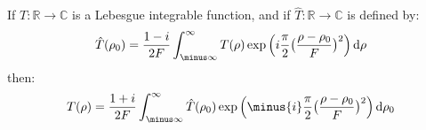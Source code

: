     \begin{theorem}
        If $T:\mathbb{R}\rightarrow\mathbb{C}$ is
        a Lebesgue integrable function, and if
        $\hat{T}:\mathbb{R}\rightarrow\mathbb{C}$
        is defined by:
        \begin{equation}
            \hat{T}(\rho_0)=
            \frac{1-i}{2F}\int_{\minus\infty}^{\infty}T(\rho)\exp\Big(
                i\frac{\pi}{2}\big(\frac{\rho-\rho_0}{F}\big)^{2}\Big)
            \diff{\rho}
        \end{equation}
        then:
        \begin{equation}
            T(\rho)=\frac{1+i}{2F}
                \int_{\minus\infty}^{\infty}\hat{T}(\rho_{0})\exp\Big(
                \minus{i}\frac{\pi}{2}\big(\frac{\rho-\rho_0}{F}\big)^{2}
                \Big)\diff{\rho_{0}}
        \end{equation}
    \end{theorem}
